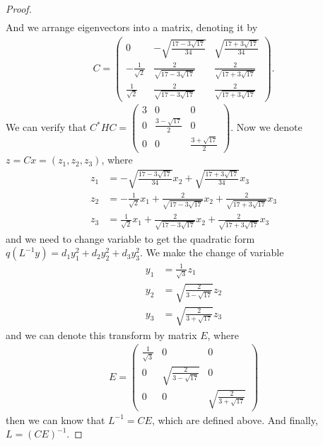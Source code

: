 \documentclass[11pt]{book}
\theoremstyle{definition}
\numberwithin{equation}{chapter}
\begin{document}
\begin{proof}
\begin{align*}
\end{align*}
And we arrange eigenvectors into a matrix, denoting it by 
\begin{align*}
    C = \left(\begin{matrix}
    0 & -\sqrt{\frac{17-3\sqrt{17}}{34}} & \sqrt{\frac{17+3\sqrt{17}}{34}} \\
    - \frac{1}{\sqrt{2}} & \frac{2}{\sqrt{17-3\sqrt{17}}} & \frac{2}{\sqrt{17+3\sqrt{17}}} \\
    \frac{1}{\sqrt{2}} & \frac{2}{\sqrt{17-3\sqrt{17}}} & \frac{2}{\sqrt{17+3\sqrt{17}}}
    \end{matrix}\right).
\end{align*}
We can verify that $C^*HC = \left(
\begin{matrix}
3 & 0 & 0\\
0 & \frac{3-\sqrt{17}}{2} & 0\\
0 & 0 & \frac{3+\sqrt{17}}{2}
\end{matrix}
\right)$. Now we denote $z = Cx = (z_1, z_2, z_3)$, where 
\begin{align*}
    z_1 & = -\sqrt{\frac{17-3\sqrt{17}}{34}}x_2 + \sqrt{\frac{17+3\sqrt{17}}{34}}x_3\\
    z_2 & = - \frac{1}{\sqrt{2}}x_1 + \frac{2}{\sqrt{17-3\sqrt{17}}}x_2 + \frac{2}{\sqrt{17+3\sqrt{17}}}x_3 \\
    z_3 & = \frac{1}{\sqrt{2}}x_1 + \frac{2}{\sqrt{17-3\sqrt{17}}}x_2 + \frac{2}{\sqrt{17+3\sqrt{17}}}x_3
\end{align*}
and we need to change variable to get the quadratic form $q\left(  L^{-1}y\right)  =d_{1}y_{1}^{2}+d_{2}y_{2}^{2}+d_{3}y_{3}^{2}$. We make the change of variable
\begin{align*}
    y_1 & = \frac{1}{\sqrt{3}}z_1 \\
    y_2 & = \sqrt{\frac{2}{3-\sqrt{17}}} z_2\\
    y_3 & = \sqrt{\frac{2}{3+\sqrt{17}}} z_3
\end{align*}
and we can denote this transform by matrix $E$, where 
\begin{align*}
    E = \left(
    \begin{matrix}
    \frac{1}{\sqrt{3}} & 0 & 0\\
    0 & \sqrt{\frac{2}{3-\sqrt{17}}} & 0\\
    0 & 0 & \sqrt{\frac{2}{3+\sqrt{17}}}
    \end{matrix}
    \right)
\end{align*}
then we can know that $L^{-1} = CE$, which are defined above. And finally, $L = (CE)^{-1}$.
\end{proof}
\end{document}
